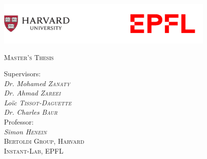 \begin{titlepage}
    \makeatletter
	\centering

    \includegraphics[width=0.80\textwidth]{images/schools.png}
	
	\par\vspace{1cm}
	{\scshape\Large Master's Thesis \par}
	\vspace{1.5cm}
	

	{\huge\bfseries \@title \par}
	\vspace{2cm}
	{\Large\itshape \@author \par}
	\vspace{1cm}
	{\Large Supervisors: \itshape \\ Dr. Mohamed \textsc{Zanaty} \\ Dr. Ahmad \textsc{Zareei} \\ Loïc \textsc{Tissot-Daguette} \\ Dr. Charles \textsc{Baur} \\}
	\vspace{1cm}
	{\Large Professor: \\ \itshape Simon \textsc{Henein} \\}
	\vspace{1cm}
	{\Large \textsc{Bertoldi Group, \small Harvard \\ \Large Instant-Lab,  \small EPFL}}
	
	\par
	\vfill
	{\scshape\large\@date}\\
	{\scshape\large}


\end{titlepage}

